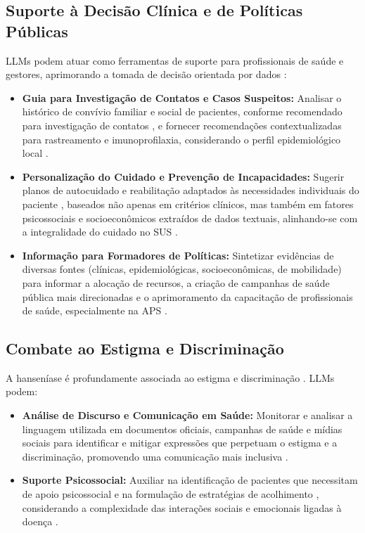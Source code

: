 \documentclass{article}
\begin{document}
\subsection{Suporte à Decisão Clínica e de Políticas Públicas}
LLMs podem atuar como ferramentas de suporte para profissionais de saúde e gestores, aprimorando a tomada de decisão orientada por dados \cite{saldanha2021ciencia}:
\begin{itemize}
    \item \textbf{Guia para Investigação de Contatos e Casos Suspeitos:} Analisar o histórico de convívio familiar e social de pacientes, conforme recomendado para investigação de contatos \cite{brasil2017guia, brasil2022pcdt}, e fornecer recomendações contextualizadas para rastreamento e imunoprofilaxia, considerando o perfil epidemiológico local \cite{brasil2022pcdt}.
    \item \textbf{Personalização do Cuidado e Prevenção de Incapacidades:} Sugerir planos de autocuidado e reabilitação adaptados às necessidades individuais do paciente \cite{brasil2017guia, brasil2022pcdt}, baseados não apenas em critérios clínicos, mas também em fatores psicossociais e socioeconômicos extraídos de dados textuais, alinhando-se com a integralidade do cuidado no SUS \cite{brasil2022pcdt}.
    \item \textbf{Informação para Formadores de Políticas:} Sintetizar evidências de diversas fontes (clínicas, epidemiológicas, socioeconômicas, de mobilidade) para informar a alocação de recursos, a criação de campanhas de saúde pública mais direcionadas e o aprimoramento da capacitação de profissionais de saúde, especialmente na APS \cite{saldanha2021ciencia, brasil2022pcdt}.
\end{itemize}

\subsection{Combate ao Estigma e Discriminação}
A hanseníase é profundamente associada ao estigma e discriminação \cite{brasil2017guia, brasil2022pcdt, inovacao_computacional_hanseniase}. LLMs podem:
\begin{itemize}
    \item \textbf{Análise de Discurso e Comunicação em Saúde:} Monitorar e analisar a linguagem utilizada em documentos oficiais, campanhas de saúde e mídias sociais para identificar e mitigar expressões que perpetuam o estigma e a discriminação, promovendo uma comunicação mais inclusiva \cite{brasil2022pcdt, inovacao_computacional_hanseniase}.
    \item \textbf{Suporte Psicossocial:} Auxiliar na identificação de pacientes que necessitam de apoio psicossocial e na formulação de estratégias de acolhimento \cite{brasil2022pcdt}, considerando a complexidade das interações sociais e emocionais ligadas à doença \cite{brasil2017guia}.
\end{itemize}
\end{document}
